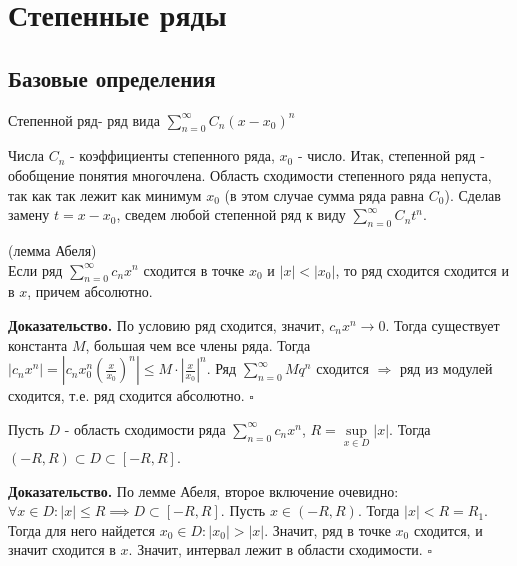\section{Степенные ряды}
\subsection{Базовые определения}
\begin{defin}
Степенной ряд- ряд вида $\sum\limits_{n=0}^{\infty} C_n(x-x_0)^n$
\end{defin}
Числа $C_n$ - коэффициенты степенного ряда,  $x_0$ - число. Итак, степенной
ряд - обобщение понятия многочлена. Область сходимости степенного ряда 
непуста, так как так лежит как минимум  $x_0$ (в этом случае сумма ряда 
равна $C_0$). Сделав замену $t=x-x_0$, сведем любой степенной ряд к виду
 $\sum\limits_{n=0}^{\infty} C_nt^n$.
\begin{theor}
    (лемма Абеля)\\
    Если ряд $\sum\limits_{n=0}^{\infty} c_nx^n$ сходится в точке $x_0$ и 
     $|x|<|x_0|$, то ряд сходится сходится и в  $x$, причем абсолютно.
\end{theor}
\textbf{Доказательство.}  По условию ряд сходится, значит,
$c_nx^n\to0$. Тогда существует константа $M$, большая чем все члены ряда. 
Тогда $|c_nx^n|=\left| c_nx_0^n \left( \frac{x}{x_0} \right)^n  \right|
\leqslant M\cdot \left| \frac{x}{x_0} \right|^n $. Ряд $\sum\limits_{n=0}^{\infty} Mq^n$ сходится $\Rightarrow$ ряд из модулей сходится, т.е. ряд 
сходится абсолютно.
$\square$ 
\begin{theor}
Пусть $D$ - область сходимости ряда  $\sum\limits_{n=0}^{\infty} c_nx^n$,
$R=\sup\limits_{x\in D} |x|$. Тогда $(-R,R)\subset D\subset [-R,R]$.
\end{theor}
\textbf{Доказательство.} 
По лемме Абеля, второе включение очевидно: $\forall x\in D:|x|\leqslant R
\implies D\subset [-R,R]$.
Пусть $x\in(-R,R)$. Тогда  $|x|<R=R_1$. Тогда 
для него найдется  $x_0\in D:|x_0|>|x|$. Значит, ряд в точке  $x_0$ сходится,
и значит сходится в  $x$. Значит, интервал лежит в области сходимости.
$\square$ 
